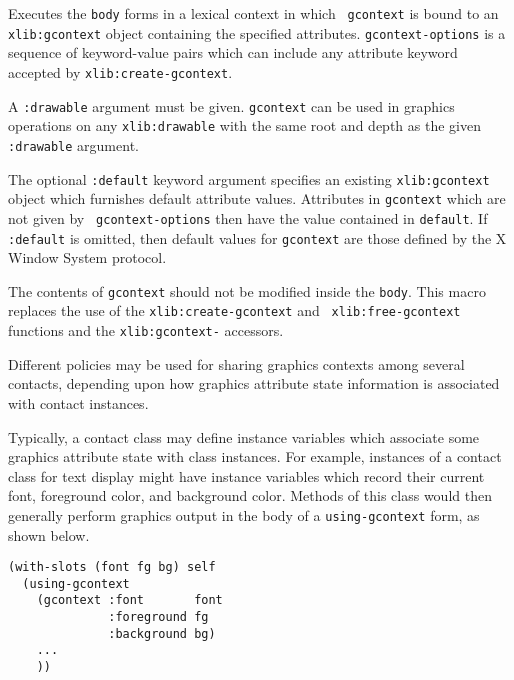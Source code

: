 \begin{flushright} \parbox[t]{6.125in}{
Executes the {\tt body} forms in a lexical context in which {\tt
gcontext} is bound to an {\tt xlib:gcontext} object containing the
specified attributes. {\tt gcontext-options} is a sequence of
keyword-value pairs which can include any attribute keyword accepted by
{\tt xlib:create-gcontext}.

A {\tt :drawable} argument must be given.  
{\tt gcontext} can be used in
graphics operations on any {\tt xlib:drawable} with the same root and depth as
the given {\tt :drawable} argument.


The optional {\tt :default} keyword argument specifies an existing
{\tt xlib:gcontext} object which furnishes default attribute values.
Attributes in {\tt gcontext} which are not given by {\tt
gcontext-options} then have the value contained in {\tt default}.
If {\tt :default} is omitted, then default values for {\tt gcontext} are
those defined by the X Window System protocol.

The contents of {\tt gcontext} should not be modified inside the {\tt body}.
This macro replaces the use of the {\tt xlib:create-gcontext} and {\tt
xlib:free-gcontext} functions and the {\tt xlib:gcontext-} accessors.

}\end{flushright}


Different policies may be used for sharing graphics contexts among
several contacts, depending upon how graphics attribute state information is
associated with contact instances.

Typically, a contact class may define instance variables which associate
some graphics attribute state with class instances. For example,
instances of a contact class for text display might have instance
variables
which record their current font, foreground color, and background color.
Methods of this class would then generally perform graphics output
in the body of a {\tt using-gcontext} form, as shown below.

{\samepage
\begin{center}
\begin{verbatim}
(with-slots (font fg bg) self
  (using-gcontext
    (gcontext :font       font
              :foreground fg
              :background bg)
    ...
    ))
\end{verbatim}

\end{center}}


